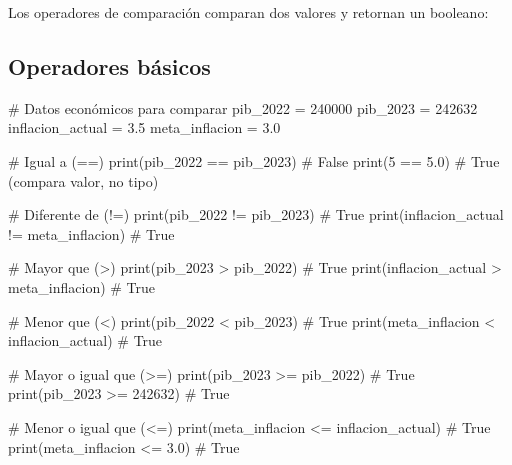 \documentclass[
  doc,
  floatsintext,
  longtable,
  a4paper,
  nolmodern,
  notxfonts,
  notimes,
  12pt,
  colorlinks=true,linkcolor=blue,citecolor=blue,urlcolor=blue]{apa7}
\newenvironment{Shaded}{\begin{snugshade}}{\end{snugshade}}
\newcommand{\BuiltInTok}[1]{\textcolor[rgb]{0.00,0.23,0.31}{#1}}
\newcommand{\CommentTok}[1]{\textcolor[rgb]{0.37,0.37,0.37}{#1}}
\newcommand{\DecValTok}[1]{\textcolor[rgb]{0.68,0.00,0.00}{#1}}
\newcommand{\FloatTok}[1]{\textcolor[rgb]{0.68,0.00,0.00}{#1}}
\newcommand{\NormalTok}[1]{\textcolor[rgb]{0.00,0.23,0.31}{#1}}
\newcommand{\OperatorTok}[1]{\textcolor[rgb]{0.37,0.37,0.37}{#1}}
\begin{document}
Los operadores de comparación comparan dos valores y retornan un
booleano:

\subsection{Operadores básicos}\label{operadores-buxe1sicos}

\begin{Shaded}
\begin{Highlighting}[]
\CommentTok{\# Datos económicos para comparar}
\NormalTok{pib\_2022 }\OperatorTok{=} \DecValTok{240000}
\NormalTok{pib\_2023 }\OperatorTok{=} \DecValTok{242632}
\NormalTok{inflacion\_actual }\OperatorTok{=} \FloatTok{3.5}
\NormalTok{meta\_inflacion }\OperatorTok{=} \FloatTok{3.0}

\CommentTok{\# Igual a (==)}
\BuiltInTok{print}\NormalTok{(pib\_2022 }\OperatorTok{==}\NormalTok{ pib\_2023)  }\CommentTok{\# False}
\BuiltInTok{print}\NormalTok{(}\DecValTok{5} \OperatorTok{==} \FloatTok{5.0}\NormalTok{)              }\CommentTok{\# True (compara valor, no tipo)}

\CommentTok{\# Diferente de (!=)}
\BuiltInTok{print}\NormalTok{(pib\_2022 }\OperatorTok{!=}\NormalTok{ pib\_2023)  }\CommentTok{\# True}
\BuiltInTok{print}\NormalTok{(inflacion\_actual }\OperatorTok{!=}\NormalTok{ meta\_inflacion)  }\CommentTok{\# True}

\CommentTok{\# Mayor que (\textgreater{})}
\BuiltInTok{print}\NormalTok{(pib\_2023 }\OperatorTok{\textgreater{}}\NormalTok{ pib\_2022)   }\CommentTok{\# True}
\BuiltInTok{print}\NormalTok{(inflacion\_actual }\OperatorTok{\textgreater{}}\NormalTok{ meta\_inflacion)  }\CommentTok{\# True}

\CommentTok{\# Menor que (\textless{})}
\BuiltInTok{print}\NormalTok{(pib\_2022 }\OperatorTok{\textless{}}\NormalTok{ pib\_2023)   }\CommentTok{\# True}
\BuiltInTok{print}\NormalTok{(meta\_inflacion }\OperatorTok{\textless{}}\NormalTok{ inflacion\_actual)  }\CommentTok{\# True}

\CommentTok{\# Mayor o igual que (\textgreater{}=)}
\BuiltInTok{print}\NormalTok{(pib\_2023 }\OperatorTok{\textgreater{}=}\NormalTok{ pib\_2022)  }\CommentTok{\# True}
\BuiltInTok{print}\NormalTok{(pib\_2023 }\OperatorTok{\textgreater{}=} \DecValTok{242632}\NormalTok{)    }\CommentTok{\# True}

\CommentTok{\# Menor o igual que (\textless{}=)}
\BuiltInTok{print}\NormalTok{(meta\_inflacion }\OperatorTok{\textless{}=}\NormalTok{ inflacion\_actual)  }\CommentTok{\# True}
\BuiltInTok{print}\NormalTok{(meta\_inflacion }\OperatorTok{\textless{}=} \FloatTok{3.0}\NormalTok{)  }\CommentTok{\# True}
\end{Highlighting}
\end{Shaded}
\end{document}
